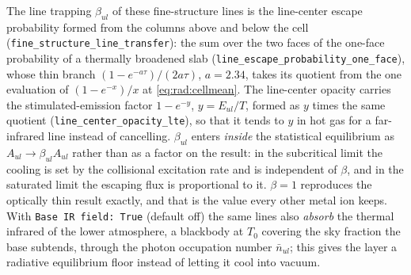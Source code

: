 The line trapping $\beta_{ul}$ of these fine-structure lines is the
line-center escape probability formed from the columns above and below the
cell (\texttt{fine\_structure\_line\_transfer}): the sum over the two faces
of the one-face probability of a thermally broadened slab
(\texttt{line\_escape\_probability\_one\_face}), whose thin branch
$(1-e^{-a\tau})/(2a\tau)$, $a = 2.34$, takes its quotient from the one
evaluation of $(1-e^{-x})/x$ at \eqref{eq:rad:cellmean}. The line-center
opacity carries the stimulated-emission factor $1-e^{-y}$, $y = E_{ul}/T$,
formed as $y$ times the same quotient (\texttt{line\_center\_opacity\_lte}),
so that it tends to $y$ in hot gas for a far-infrared line instead of
cancelling. $\beta_{ul}$ enters \emph{inside}
the statistical equilibrium as $A_{ul}\to\beta_{ul}A_{ul}$ rather than as a
factor on the result: in the subcritical limit the cooling is set by the
collisional excitation rate and is independent of $\beta$, and in the
saturated limit the escaping flux is proportional to it. $\beta = 1$
reproduces the optically thin result exactly, and that is the value every
other metal ion keeps. With \texttt{Base IR field: True} (default off) the
same lines also \emph{absorb} the thermal infrared of the lower atmosphere,
a blackbody at $T_0$ covering the sky fraction the base subtends, through
the photon occupation number $\bar n_{ul}$; this gives the layer a radiative
equilibrium floor instead of letting it cool into vacuum.

